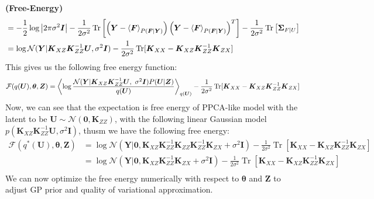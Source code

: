\begin{remark}{\textbf{(Free-Energy)}}
\begin{equation*}
\begin{aligned}
        &= -\frac{1}{2}\log \left| 2\pi\sigma^2\boldsymbol I \right| - \frac{1}{2\sigma^2}\operatorname{Tr}\left[  \left( \boldsymbol Y - \left\langle \boldsymbol F \right\rangle_{P(\boldsymbol F | \boldsymbol Y)} \right) \left( \boldsymbol Y - \left\langle \boldsymbol F \right\rangle_{P(\boldsymbol F|\boldsymbol Y)} \right)^T  \right] - \frac{1}{2\sigma^2}\operatorname{Tr}\left[ \boldsymbol \Sigma_{F|U} \right] \\
        &= \log \mathcal{N}(\boldsymbol Y | \boldsymbol K_{XZ}\boldsymbol K^{-1}_{ZZ}\boldsymbol U, \sigma^2\boldsymbol I) - \frac{1}{2\sigma^2}\operatorname{Tr}[\boldsymbol K_{XX} - \boldsymbol K_{XZ}\boldsymbol K_{ZZ}^{-1}\boldsymbol K_{ZX}]
    \end{aligned}
    \end{equation*}
    This gives us the following free energy function:
    \begin{equation*}
        \mathcal{F}(q(\boldsymbol U), \boldsymbol \theta, \boldsymbol Z) = \left\langle \log \frac{\mathcal{N}(\boldsymbol Y | \boldsymbol K_{XZ}\boldsymbol K^{-1}_{ZZ} \boldsymbol U, \ \sigma^2\boldsymbol I) P(\boldsymbol U | \boldsymbol Z) }{ q(\boldsymbol U) } \right\rangle_{q(\boldsymbol U)} - \frac{1}{2\sigma^2}\operatorname{Tr}[\boldsymbol K_{XX} - \boldsymbol K_{XZ}\boldsymbol K_{ZZ}^{-1}\boldsymbol K_{ZX}]
    \end{equation*}
    Now, we can see that the expectation is free energy of PPCA-like model with the latent to be $\boldsymbol U \sim \mathcal{N}(\boldsymbol 0, \boldsymbol K_{ZZ})$, with the following linear Gaussian model $p(\boldsymbol K_{XZ}\boldsymbol K_{ZZ}^{-1} \boldsymbol U, \sigma^2 \boldsymbol I)$, thusm we have the following free energy:
    \begin{equation*}
    \begin{aligned}
        \mathcal{F}(q^*(\boldsymbol U), \boldsymbol \theta, \boldsymbol Z) 
        &= \log \mathcal{N}(\boldsymbol Y | \boldsymbol 0, \boldsymbol K_{XZ}\boldsymbol K_{ZZ}^{-1}\boldsymbol K_{ZZ}\boldsymbol K_{ZZ}^{-1}\boldsymbol K_{ZX} + \sigma^2\boldsymbol I) - \frac{1}{2\sigma^2}\operatorname{Tr}[\boldsymbol K_{XX} - \boldsymbol K_{XZ}\boldsymbol K_{ZZ}^{-1}\boldsymbol K_{ZX}] \\
        &= \log \mathcal{N}(\boldsymbol Y | \boldsymbol 0, \boldsymbol K_{XZ}\boldsymbol K_{ZZ}^{-1}\boldsymbol K_{ZX} + \sigma^2\boldsymbol I) - \frac{1}{2\sigma^2}\operatorname{Tr}[\boldsymbol K_{XX} - \boldsymbol K_{XZ}\boldsymbol K_{ZZ}^{-1}\boldsymbol K_{ZX}] \\
    \end{aligned}
    \end{equation*}
    We can now optimize the free energy numerically with respect to $\boldsymbol \theta$ and $\boldsymbol Z$ to adjust GP prior and quality of variational approximation. 
\end{remark}

